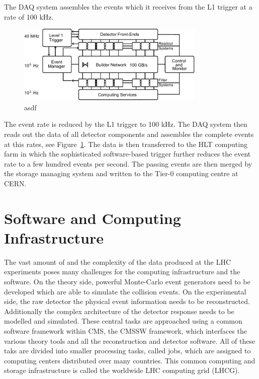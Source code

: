 The DAQ system assembles the events which it receives from the L1 trigger at a
rate of 100 kHz.

\begin{figure}[htp]
    \centering
    \includegraphics[width=0.8\textwidth]{figures/cms_detector/cms_daq.pdf}\hfill
    \caption[The DAQ System of CMS]{asdf~\cite{Sphicas:2002gg}}
    \label{fig:cms:daq_system}
\end{figure}

The event rate is reduced by the L1 trigger to 100 kHz. The DAQ system then
reads out the data of all detector components and assembles the complete events
at this rates, see Figure~\ref{fig:cms:daq_system}. The data is then transferred
to the HLT computing farm in which the sophisticated software-based trigger further
reduces the event rate to a few hundred events per second. The passing events
are then merged by the storage managing system and written to the Tier-0
computing centre at CERN.

\section{Software and Computing Infrastructure}

The vast amount of and the complexity of the data produced at the LHC
experiments poses many challenges for the computing infrastructure and the
software. On the theory side, powerful Monte-Carlo event generators need to be
developed which are able to simulate the collision events. On the experimental
side, the raw detector the physical event information needs to be reconstructed. Additionally the
complex architecture of the detector response needs to be modelled and
simulated. These central tasks are approached using a common software framework
within CMS, the CMSSW framework, which interfaces the various theory tools and
all the reconstruction and detector software. All of these taks are divided
into smaller processing tasks, called jobs, which are assigned to computing
centers distributed over many countries. This common computing and storage
infrastructure is called the worldwide LHC computing grid (LHCG).

